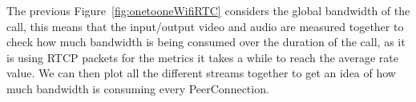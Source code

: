 The previous Figure~\ref{fig:onetooneWifiRTC} considers the global bandwidth of the call, this means that the input/output video and audio are measured together to check how much bandwidth is being consumed over the duration of the call, as it is using RTCP packets for the metrics it takes a while to reach the average rate value. We can then plot all the different streams together to get an idea of how much bandwidth is consuming every PeerConnection.

%




